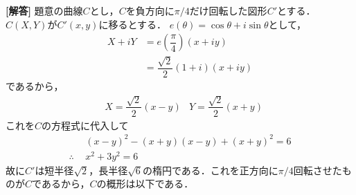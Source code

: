 \documentclass[../../main.tex]{subfiles}
\begin{document}
\begin{oframed}
  
\end{oframed}

{\bf [解答]} 題意の曲線$C$とし，$C$を負方向に$\pi/4$だけ回転した図形$C'$とする．$C(X,Y)$が$C'(x,y)$に移るとする．
$e(\theta)=\cos\theta+i\sin\theta$として，
\begin{align}
  X+iY&=e\left(\dfrac{\pi}{4}\right)(x+iy) \\
  &=\dfrac{\sqrt{2}}{2}(1+i)(x+iy)
\end{align}
であるから，
\begin{align}
  &X=\dfrac{\sqrt{2}}{2}(x-y) &
  Y=\dfrac{\sqrt{2}}{2}(x+y)
\end{align}
これを$C$の方程式に代入して
\begin{align}
  &(x-y)^2-(x+y)(x-y)+(x+y)^2=6 \\
  \therefore \,\ &x^2+3y^2=6
\end{align}
故に$C'$は短半径$\sqrt{2}$，長半径$\sqrt{6}$の楕円である．これを正方向に$\pi/4$回転させたものが$C$であるから，$C$の概形は以下である．
\end{document}
